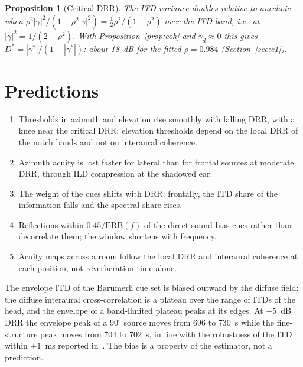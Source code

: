 \documentclass[10pt]{article}
\newtheorem{proposition}{Proposition}
\theoremstyle{definition}
\begin{document}
\begin{proposition}[Critical DRR]
The ITD variance doubles relative to anechoic when $\rho^2|\gamma|^2/(1-\rho^2|\gamma|^2)=\tfrac12\rho^2/(1-\rho^2)$ over the ITD band, i.e.\ at $|\gamma|^{2}=1/(2-\rho^2)$. With Proposition~\ref{prop:coh} and $\gamma_d\approx0$ this gives $D^{*}=|\gamma^*|/(1-|\gamma^*|)$: about 18~dB for the fitted $\rho=0.984$ (Section~\ref{sec:c1}).
\end{proposition}

\section{Predictions}
\begin{enumerate}
\item Thresholds in azimuth and elevation rise smoothly with falling DRR, with a knee near the critical DRR; elevation thresholds depend on the local DRR of the notch bands and not on interaural coherence.
\item Azimuth acuity is lost faster for lateral than for frontal sources at moderate DRR, through ILD compression at the shadowed ear.
\item The weight of the cues shifts with DRR: frontally, the ITD share of the information falls and the spectral share rises.
\item Reflections within $0.45/\mathrm{ERB}(f)$ of the direct sound bias cues rather than decorrelate them; the window shortens with frequency.
\item Acuity maps across a room follow the local DRR and interaural coherence at each position, not reverberation time alone.
\end{enumerate}
The envelope ITD of the Barumerli cue set is biased outward by the diffuse field: the diffuse interaural cross-correlation is a plateau over the range of ITDs of the head, and the envelope of a band-limited plateau peaks at its edges. At $-5$~dB DRR the envelope peak of a $90^\circ$ source moves from 696 to 730~\textmu s while the fine-structure peak moves from 704 to 702~\textmu s, in line with the robustness of the ITD within $\pm1$~ms reported in~\cite{shinn2005}. The bias is a property of the estimator, not a prediction.
\end{document}
